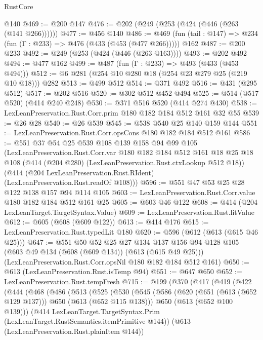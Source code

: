 \begin{lexlean}{RustCore}
\begin{coremodule}
    @140
@469 := @200 @147
@476 := @202 (@249 (@253 (@424 (@446 (@263 (@141 @266))))))
@477 := @456 @140
@486 := @469 (fun (tail : @147) => @234 (fun (Γ : @233) => @476 (@433 (@453 (@477 @266))))) @162
@487 := @200 @233
@492 := @249 (@253 (@424 (@446 (@263 @163))))
@493 := @202 @492
@494 := @477 @162
@499 := @487 (fun (Γ : @233) => @493 (@433 (@453 @494)))
@512 := @6 @281 (@254 @10 @280 @18 (@254 @23 @279 @25 (@219 @10 @18))) @282
@513 := @499 @512
@514 := @371 @492
@516 := @431 (@295 @512)
@517 := @202 @516
@520 := @302 @512 @452 @494
@525 := @514 (@517 @520) (@414 @240 @248)
@530 := @371 @516 @520 (@414 @274 @430)
@538 := LexLeanPreservation.Rust.Corr.prim @180 @182 @184 @512 @161 @32 @55
@539 := @26 @28
@540 := @26 @539
@545 := @538 @540 @25 @140 @159 @144
@551 := LexLeanPreservation.Rust.Corr.opsCons @180 @182 @184 @512 @161
@586 := @551
    @37
    @54
    @25
    @539
    @108
    @139
    @158
    @94
    @99
    @105
    (LexLeanPreservation.Rust.Corr.var
      @180
      @182
      @184
      @512
      @161
      @18
      @25
      @18
      @108
      (@414 (@204 @280) (LexLeanPreservation.Rust.ctxLookup @512 @18))
      (@414 (@204 LexLeanPreservation.Rust.RIdent) (LexLeanPreservation.Rust.readOf @108)))
@596 := @551 @47 @53 @25 @28 @122 @138 @157 @94 @114 @105
@603 := LexLeanPreservation.Rust.Corr.value @180 @182 @184 @512 @161 @25
@605 := @603 @46 @122
@608 := @414 (@204 LexLeanTarget.TargetSyntax.Value)
@609 := LexLeanPreservation.Rust.litValue
@612 := @605 (@608 (@609 @122))
@613 := @414 @176
@615 := LexLeanPreservation.Rust.typedLit @180
@620 := @596 (@612 (@613 (@615 @46 @25)))
@647 := @551
    @50
    @52
    @25
    @27
    @134
    @137
    @156
    @94
    @128
    @105
    (@603 @49 @134 (@608 (@609 @134)) (@613 (@615 @49 @25)))
    (LexLeanPreservation.Rust.Corr.opsNil @180 @182 @184 @512 @161)
@650 := @613 (LexLeanPreservation.Rust.isTemp @94)
@651 := @647 @650
@652 := LexLeanPreservation.Rust.tempFresh
@715 := @199
    (@370
      (@417
        (@419
          (@422
            (@444
              (@468
                (@486
                  (@513
                    (@525
                      (@530
                        (@545
                          (@586
                            (@620 (@651 (@613 (@652 @129 @137))) @650 (@613 (@652 @115 @138)))
                            @650
                            (@613 (@652 @100 @139)))
                          (@414
                            LexLeanTarget.TargetSyntax.Prim
                            (LexLeanTarget.RustSemantics.itemPrimitive @144))
                          (@613 (LexLeanPreservation.Rust.plainItem @144))

\end{coremodule}
\end{lexlean}
